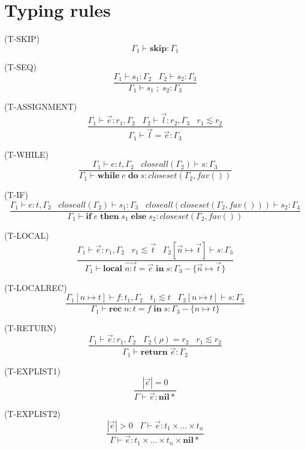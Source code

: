 \documentclass{paper}
\newcommand{\Nil}{\mathbf{nil}}
\newcommand{\mylabel}[1]{\; (\textsc{#1})}
\newcommand{\env}{\Gamma}
\newcommand{\ret}{\rho}
\begin{document}
\section{Typing rules}

\noindent

\mylabel{T-SKIP}
\[
\env_{1} \vdash \mathbf{skip}:\env_{1}
\]

\mylabel{T-SEQ}
\[
\dfrac{\env_{1} \vdash s_{1}:\env_{2} \;\;\;
       \env_{2} \vdash s_{2}:\env_{3}}
      {\env_{1} \vdash s_{1} \; ; \; s_{2}:\env_{3}}
\]

\mylabel{T-ASSIGNMENT}
\[
\dfrac{\env_{1} \vdash \vec{e}:r_{1}, \env_{2} \;\;\;
       \env_{2} \vdash \vec{l}:r_{2}, \env_{3} \;\;\;
       r_{1} \lesssim r_{2}}
      {\env_{1} \vdash \vec{l} = \vec{e}:\env_{3}}
\]

\mylabel{T-WHILE}
\[
\dfrac{\env_{1} \vdash e:t, \env_{2} \;\;\;
       closeall(\env_{2}) \vdash s:\env_{3}}
      {\env_{1} \vdash \mathbf{while} \; e \; \mathbf{do} \; s:closeset(\env_{2}, fav())}
\]

\mylabel{T-IF}
\[
\dfrac{\env_{1} \vdash e:t, \env_{2} \;\;\;
       closeall(\env_{2}) \vdash s_{1}:\env_{3} \;\;\;
       closeall(closeset(\env_{2}, fav())) \vdash s_{2}:\env_{4}}
      {\env_{1} \vdash \mathbf{if} \; e \; \mathbf{then} \; s_{1} \; \mathbf{else} \; s_{2}:closeset(\env_{2}, fav())}
\]

\mylabel{T-LOCAL}
\[
\dfrac{\env_{1} \vdash \vec{e}:r_{1}, \env_{2} \;\;\;
       r_{1} \lesssim \vec{t} \;\;\;
       \env_{2}[\vec{n} \mapsto \vec{t}] \vdash s:\env_{3}}
      {\env_{1} \vdash \mathbf{local} \; \vec{n{:}t} = \vec{e} \; \mathbf{in} \; s:\env_{3} - \{\vec{n} \mapsto \vec{t}\}}
\]

\mylabel{T-LOCALREC}
\[
\dfrac{\env_{1}[n \mapsto t] \vdash f:t_{1}, \env_{2} \;\;\;
       t_{1} \lesssim t \;\;\;
       \env_{2}[n \mapsto t] \vdash s:\env_{3}}
      {\env_{1} \vdash \mathbf{rec} \; n{:}t = f \; \mathbf{in} \; s:\env_{3} - \{n \mapsto t\}}
\]

\mylabel{T-RETURN}
\[
\dfrac{\env_{1} \vdash \vec{e}:r_{1}, \env_{2} \;\;\;
       \env_{2}(\ret) = r_{2} \;\;\;
       r_{1} \lesssim r_{2}}
      {\env_{1} \vdash \mathbf{return} \; \vec{e}:\env_{2}}
\]

\mylabel{T-EXPLIST1}
\[
\dfrac{|\vec{e}| = 0}
      {\env \vdash \vec{e}:\Nil{*}}
\]

\mylabel{T-EXPLIST2}
\[
\dfrac{|\vec{e}| > 0 \;\;\;
       \env \vdash \vec{e}:t_{1} \times ... \times t_{n}}
      {\env \vdash \vec{e}:t_{1} \times ... \times t_{n} \times \Nil{*}}
\]
\end{document}
